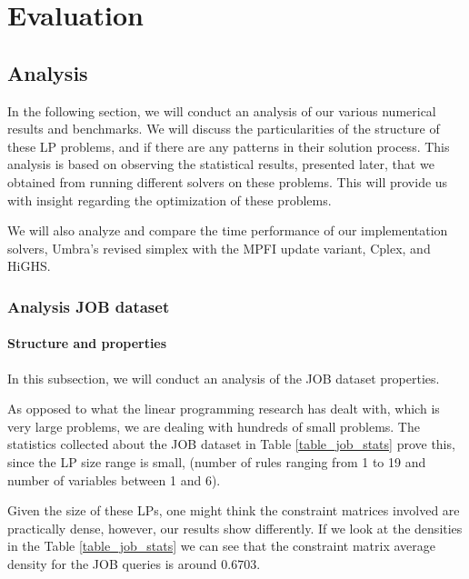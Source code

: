 
\chapter{Evaluation}\label{chapter:evaluation}
\section{Analysis}
In the following section, we will conduct an analysis of our various numerical results
and benchmarks.
We will discuss the
particularities of the structure of these LP problems, and if there are any
patterns in their solution
process. This analysis is based on observing the statistical results, presented later, that we obtained from
running different solvers on these problems. This will provide us with insight
regarding the optimization of these problems.

We will also analyze and compare the time performance of our implementation solvers,
Umbra's revised simplex with the MPFI update variant, Cplex, and HiGHS.


\subsection{Analysis JOB dataset}

\subsubsection{Structure and properties}
In this subsection, we will conduct an analysis of the JOB dataset properties.

As opposed to what the linear programming research has dealt with, which is
very large problems, we are dealing with hundreds of small problems. The statistics
collected about the JOB dataset in Table \ref{table_job_stats} prove this, since the LP size range is small, (number
of rules ranging from 1 to 19 and number of variables between 1 and 6).

Given the size of these LPs, one might think the constraint matrices involved
are practically dense, however, our results show differently. If we look at the densities
in the Table \ref{table_job_stats} we can see that the constraint matrix average density
for the JOB queries is around $0.6703$.

